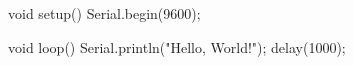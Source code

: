 void setup() {
  Serial.begin(9600);
}

void loop() {
  Serial.println("Hello, World!");
  delay(1000);
}
